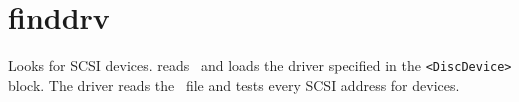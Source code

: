 \section{finddrv}
\begin{man}
  \PP Looks for SCSI devices.
   reads \HEDI\ and loads the driver specified
             in the {\tt <DiscDevice>} block. The driver reads the
             \HESI\ file and tests every SCSI address for devices.
\end{man}
